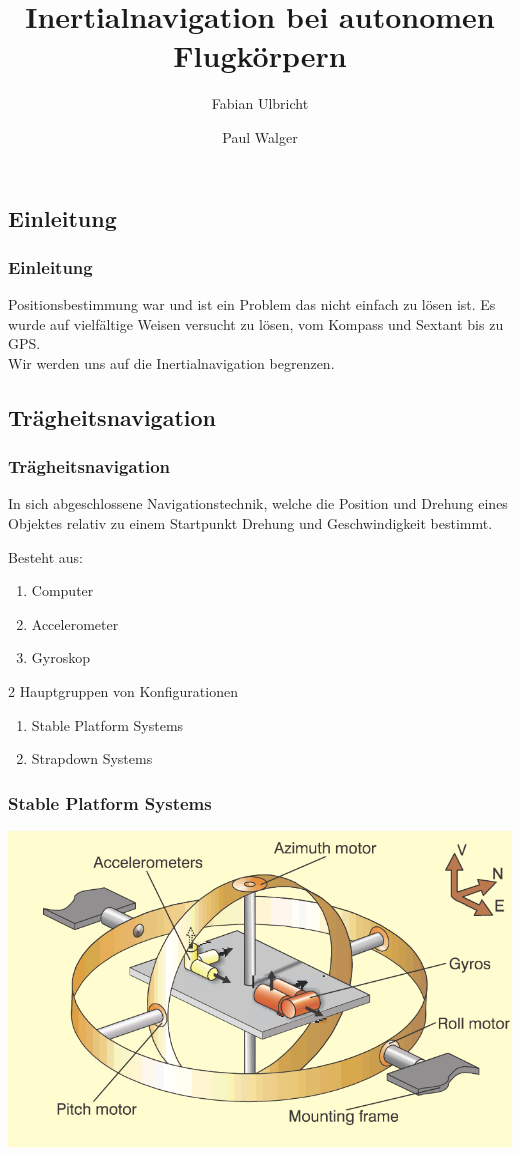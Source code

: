 \documentclass[10pt,a4paper,oneside]{beamer}
\title{Inertialnavigation bei autonomen Flugkörpern}
\author{
	Fabian Ulbricht \and
	Paul Walger 
}
\begin{document}
\frame{
	\titlepage
}


\begin{frame}
  \section{Einleitung}
  \frametitle{Einleitung}
  
  Positionsbestimmung war und ist ein Problem das nicht einfach zu lösen ist.
  Es wurde auf vielfältige Weisen versucht zu lösen, vom Kompass und Sextant bis zu GPS.\\
  Wir werden uns auf die Inertialnavigation begrenzen. 
\end{frame}


\begin{frame}
	\section{Trägheitsnavigation}
	\frametitle{Trägheitsnavigation}
	In sich abgeschlossene Navigationstechnik, 
	welche die Position und Drehung eines Objektes relativ zu einem Startpunkt Drehung und Geschwindigkeit bestimmt.
	
	Besteht aus:
	\begin{enumerate}
		\item Computer
		\item Accelerometer
		\item Gyroskop
	\end{enumerate}
	
	2 Hauptgruppen von Konfigurationen \cite{Wood07}
	\begin{enumerate}
		\item Stable Platform Systems
		\item Strapdown Systems
	\end{enumerate}
\end{frame}
\begin{frame}
	\frametitle{Stable Platform Systems}
	   
		\includegraphics[scale=0.55]{images/gimbal.png} \cite{King98}


\end{frame}
\end{document}

